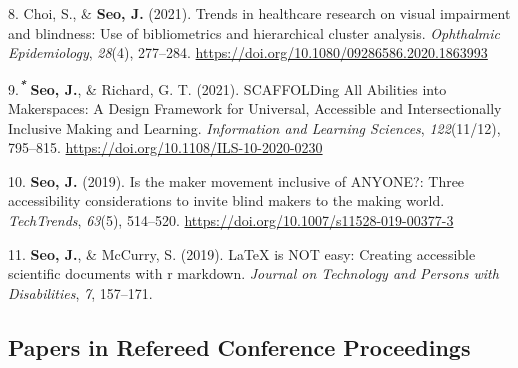 \documentclass[11pt,a4paper,]{awesome-cv}
\newlength{\cslhangindent}
\newenvironment{CSLReferences}[2] %
 {\begin{list}{}{%
  \setlength{\itemindent}{0pt}
  \setlength{\leftmargin}{0pt}
  \setlength{\parsep}{0pt}
  \ifodd #1
   \setlength{\leftmargin}{\cslhangindent}
   \setlength{\itemindent}{-1\cslhangindent}
  \fi
  \setlength{\itemsep}{#2\baselineskip}}}
 {\end{list}}
\begin{document}
\begin{CSLReferences}{1}{0}
8. Choi, S., \& \textbf{Seo, J.} (2021). Trends in healthcare research
on visual impairment and blindness: Use of bibliometrics and
hierarchical cluster analysis. \emph{Ophthalmic Epidemiology},
\emph{28}(4), 277--284.
\url{https://doi.org/10.1080/09286586.2020.1863993}

9.\textsuperscript{\textbf{\emph{*}}} \textbf{Seo, J.}, \& Richard, G.
T. (2021). SCAFFOLDing All Abilities into Makerspaces: A Design
Framework for Universal, Accessible and Intersectionally Inclusive
Making and Learning. \emph{Information and Learning Sciences},
\emph{122}(11/12), 795--815.
\url{https://doi.org/10.1108/ILS-10-2020-0230}

10. \textbf{Seo, J.} (2019). Is the maker movement inclusive of ANYONE?:
Three accessibility considerations to invite blind makers to the making
world. \emph{TechTrends}, \emph{63}(5), 514--520.
\url{https://doi.org/10.1007/s11528-019-00377-3}

11. \textbf{Seo, J.}, \& McCurry, S. (2019). LaTeX is NOT easy: Creating
accessible scientific documents with r markdown. \emph{Journal on
Technology and Persons with Disabilities}, \emph{7}, 157--171.

\end{CSLReferences}

\subsection{Papers in Refereed Conference
Proceedings}\label{papers-in-refereed-conference-proceedings}
\end{document}
